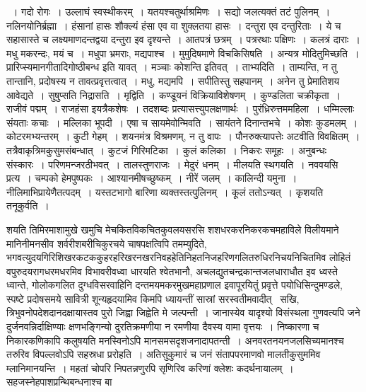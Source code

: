 \documentclass[11pt, openany]{book}
\begin{document}
\noindent
{~। गदो रोगः~। उल्लाघं स्वस्थीकरम्~। यतयश्चतुर्थाश्रमिणः~। सद्यो जलत्यक्तं तटं पुलिनम्~। नलिनयोनिर्ब्रह्मा~। हंसानां हासः शौक्ल्यं हंसा एव वा शुक्लतया हासः~। दन्तुरा एव दन्तुरिताः~। ये च सहासास्ते च लक्ष्यमाणदन्तद्वया दन्तुरा इव दृश्यन्ते~। आतपत्रं छत्रम्~। पत्ररथाः पक्षिणः~। कलत्रं दाराः~। मधु मकरन्दः, मयं च~। मधुपा भ्रमराः, मद्यपाश्च~। मुमुदिषमाणे विचकिसिषति~। अन्यत्र मोदितुमिच्छति~। प्रारिप्स्यमानगीतादिगोष्ठीबन्ध इति यावत्~। {\qt मञ्चाः कोशन्ति} इतिवत्~। {\qtt ताभ्यदिति}~। ताम्यन्ति, न तु तान्तानि, प्रदोषस्य न तावत्प्रवृत्तत्वात्~। मधु, मद्यमपि~। सपीतिस्तु सहपानम्~। अनेन तु प्रेमातिशय आवेद्यते~। सुषुप्सति निद्रासति~। {\qtt मृद्विति}~। कण्डूयनं विक्रियाविशेषणम्~। कुण्डलिता चक्रीकृता~। राजीवं पद्मम्~। राजहंसा इयत्रैकशेषः~। तदशब्दः प्रत्यासत्त्युपलक्षणार्थः~। पुरंध्रिरुत्तममहिला~। धम्मिल्लाः संयताः कचाः~। मल्लिका भूपदी~। एषा च सायमेवोन्मिवति~। सायंतने दिनान्तभचे~। कोशः कुडमलम्~। कोटरमभ्यन्तरम्~। कुटी गेहम्~। शयनमंत्र विश्रमणम्, न तु वापः~। पौनरुक्त्यापत्तेः अटवीति विवक्षितम्~। तत्रैवाकृत्रिमकुसुमसंबन्धात्~। कुटजं गिरिमटिका~। कुलं कलिका~। निकरः समूहः~। अनुबन्धः संस्कारः~। परिणमन्जरठीभवत्~। तालस्तुणराजः~। मेदुरं धनम्~। मीलयति स्थगयति~। नववयसि प्रत्य~। चम्पको हेमपुष्पकः~। आश्यानमीषच्छुष्कम्~। नीरें जलम्~। कालिन्दी यमुना~। नीलिमाभिप्रायेणैतत्पदम्~। यस्तटभागो बारिणा व्यक्तस्तत्पुलिनम्~। कूलं ततोऽन्यत्~। कृशयति तनूकुर्वति~।}

\newpage

\begin{sloppypar}
\noindent
शयति तिमिरमाशामुखे खमुचि मेचकितविकचितकुवलयसरसि शशधरकरनिकरकचमहाविले विलीयमाने मानिनीमनसीव शर्वरीशबरीचिकुरचये चाषपक्षत्विपि तमम्युदिते, भगवत्युदयगिरिशिखरकटककुहरहरिखरनखरनिवहहेतिनिहतनिजहरिणगलितरुधिरनिचयनिचितमिव लोहितं वपुरुदयरागधरमधरमिव विभावरीवध्वा धारयति श्वेतभानौ, अचलद्युतचन्द्रकान्तजलधाराधौत इव ध्वस्ते ध्वान्ते, गोलोकगलित दुग्धविसरवाहिनि दन्तमयमकरमुखमहाप्रणाल इवापूरयितुं प्रवृत्ते पयोधिसिन्दुमण्डले, स्पष्टे प्रदोषसमये सावित्री शून्यहृदयामिव किमपि ध्यायन्तीं सास्रां सरस्वतीमवादीत् \textendash\ सखि, त्रिभुवनोपदेशदानदक्षायास्तव पुरो जिह्वा जिह्वेति मे जल्पन्ती~। जानास्येव यादृश्यो विसंस्थला गुणवत्यपि जने दुर्जनवन्निर्दाक्षिण्याः क्षणभङ्गिन्यो दुरतिक्रमणीया न रमणीया दैवस्य वामा वृत्तयः~। निष्कारणा च निकारकणिकापि कलुषयति मनस्विनोऽपि मानसमसदृशजनादापतन्ती~। अनवरतनयनजलसिच्यमानश्च तरुरिव विपल्लवोऽपि सहस्रधा प्ररोहति~। अतिसुकुमारं च जनं संतापपरमाणवो मालतीकुसुममिव म्लानिमानयन्ति~। महतां चोपरि निपतन्नणुरपि सृणिरिव करिणां क्लेशः कदर्थनायालम्~। सहजस्नेहपाशप्रन्थिबन्धनाश्च बा\textendash
\end{sloppypar}
\end{document}
